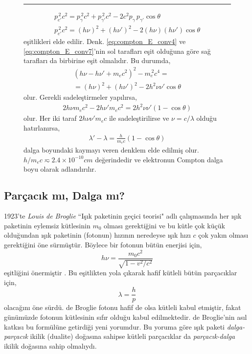 \documentclass[a4paper,12pt, twoside]{article}
\begin{document}
\begin{figure}[hbtp]
\begin{minipage}{0.54\textwidth}
\noindent\rule{.98\textwidth}{0.4pt}
\begin{align}
\label{eq:compton_E_conv7}
p_{e'}^{\, 2}c^2 = p_{\gamma}^{\, 2}c^2 + p_{\gamma'}^{\, 2}c^2 - 2c^2 p_{\gamma}\, p_{\gamma'} \cos\theta \nonumber \\
p_{e'}^{\, 2}c^2 = (h \nu)^2 + (h \nu')^2 - 2(h\nu)(h \nu')\cos{\theta}
\end{align}
eşitlikleri elde edilir. Denk. \ref{eq:compton_E_conv4} ve  \ref{eq:compton_E_conv7}'nin sol tarafları eşit olduğuna göre sağ tarafları da birbirine eşit olmalıdır. Bu durumda,
\begin{align}
\label{eq:compton_E_conv8}
(h\nu - h\nu' + m_e c^2)^2 - m_e^{\, 2}c^4 = \nonumber\\
= \left(h\nu\right)^2 + \left(h \nu'\right)^2 - 2h^2 \nu\nu'\cos{\theta}
\end{align}
olur. Gerekli sadeleştirmeler yapılırsa,
\begin{align}
\label{eq:compton_E_conv9}
2 h \nu m_e c^2-2 h \nu' m_e c^2   = 2 h^2 \nu \nu' \left( 1 - \cos \theta \right)
\end{align}
olur. Her iki taraf $ 2h\nu\nu'm_e c$ ile sadeleştirilirse ve $\nu = c/\lambda$ olduğu hatırlanırsa,
\begin{align}
\label{eq:compton_E_conv10}
\lambda'-\lambda = \frac{h}{m_ec}(1-\cos{\theta})
\end{align}
dalga boyundaki kaymayı veren denklem elde edilmiş olur. $h/m_e c \eqsim 2.4\times10^{-10} cm$ değerindedir ve elektronun Compton dalga boyu olarak adlandırılır.

\end{minipage}
\end{figure}


\newpage

\subsection{Parçacık mı, Dalga mı?}

1923'te {\it Louis de Broglie} ``Işık paketinin geçici teorisi" adlı çalışmasında her ışık paketinin eylemsiz kütlesinin $m_0$ olması gerektiğini ve
bu kütle çok küçük olduğundan ışık paketinin (fotonun) hızının neredeyse ışık hızı $c$ çok yakın olması gerektiğini öne sürmüştür. Böylece bir fotonun bütün enerjisi için,
\begin{equation}
\label{eq:foton_deBroglie_E}
h \nu = \frac{m_0 c^2}{\sqrt{1-v^2/c^2}}
\end{equation}
eşitliğini önermiştir \cite{book:FrenchAP}. Bu eşitlikten yola çıkarak hafif kütleli bütün parçacıklar için,
\begin{equation}
\label{eq:deBroglie_P}
\lambda = \frac{h}{p}
\end{equation}
olacağını öne sürdü. de Broglie fotonu hafif de olsa kütleli kabul etmiştir, fakat günümüzde fotonun kütlesinin sıfır olduğu kabul edilmektedir. de Broglie'nin asıl katkısı bu formülüne getirdiği yeni yorumdur. Bu yoruma göre ışık paketi {\it dalga-parçacık} ikilik (dualite) doğasına sahipse kütleli parçacıklar da {\it parçacık-dalga} ikilik doğasına sahip olmalıydı. 
\end{document}
